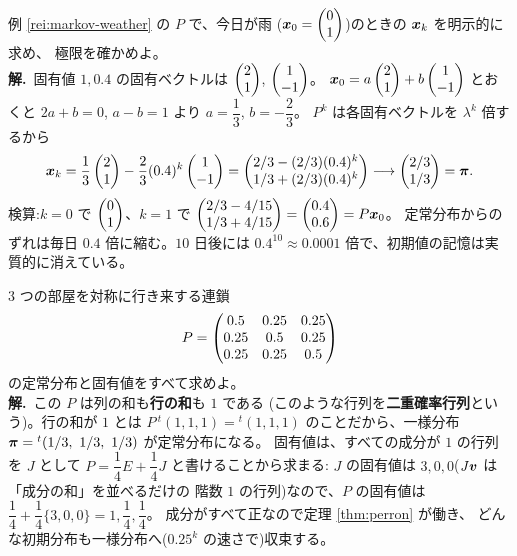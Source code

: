 \begin{rei}[例題・標準(分布の明示式と収束の速さ)]\label{rei:markov-std2}
例 \ref{rei:markov-weather} の $P$ で、今日が雨
($\bm{x}_0 = \begin{pmatrix}0 \\ 1\end{pmatrix}$)のときの $\bm{x}_k$ を明示的に求め、
極限を確かめよ。\\
\textbf{解.}\ 固有値 $1, 0.4$ の固有ベクトルは
$\begin{pmatrix}2 \\ 1\end{pmatrix}$, $\begin{pmatrix}1 \\ -1\end{pmatrix}$。
$\bm{x}_0 = a\begin{pmatrix}2 \\ 1\end{pmatrix} + b\begin{pmatrix}1 \\ -1\end{pmatrix}$ とおくと
$2a + b = 0$, $a - b = 1$ より $a = \dfrac{1}{3}$, $b = -\dfrac{2}{3}$。
$P^k$ は各固有ベクトルを $\lambda^k$ 倍するから
\[
\bm{x}_k = \frac{1}{3}\begin{pmatrix}2 \\ 1\end{pmatrix} - \frac{2}{3}(0.4)^k \begin{pmatrix}1 \\ -1\end{pmatrix}
= \begin{pmatrix}2/3 - (2/3)(0.4)^k \\ 1/3 + (2/3)(0.4)^k\end{pmatrix}
\longrightarrow \begin{pmatrix}2/3 \\ 1/3\end{pmatrix} = \bm{\pi}.
\]
検算:$k = 0$ で $\begin{pmatrix}0 \\ 1\end{pmatrix}$、$k = 1$ で
$\begin{pmatrix}2/3 - 4/15 \\ 1/3 + 4/15\end{pmatrix} = \begin{pmatrix}0.4 \\ 0.6\end{pmatrix} = P\bm{x}_0$。
定常分布からのずれは毎日 $0.4$ 倍に縮む。$10$ 日後には
$0.4^{10} \approx 0.0001$ 倍で、初期値の記憶は実質的に消えている。
\end{rei}

\begin{rei}[例題・標準(対称な連鎖と一様分布)]\label{rei:markov-std3}
$3$ つの部屋を対称に行き来する連鎖
\[
P = \begin{pmatrix}0.5 & 0.25 & 0.25 \\ 0.25 & 0.5 & 0.25 \\ 0.25 & 0.25 & 0.5\end{pmatrix}
\]
の定常分布と固有値をすべて求めよ。\\
\textbf{解.}\ この $P$ は列の和も\textbf{行の和}も $1$ である
(このような行列を\textbf{二重確率行列}という)。行の和が $1$ とは
$P\,{}^t(1,1,1) = {}^t(1,1,1)$ のことだから、一様分布
$\bm{\pi} = {}^t(1/3,\ 1/3,\ 1/3)$ が定常分布になる。
固有値は、すべての成分が $1$ の行列を $J$ として
$P = \dfrac{1}{4}E + \dfrac{1}{4}J$ と書けることから求まる:
$J$ の固有値は $3, 0, 0$($J\bm{v}$ は「成分の和」を並べるだけの
階数 $1$ の行列)なので、$P$ の固有値は
$\dfrac{1}{4} + \dfrac{1}{4}\{3, 0, 0\} = 1, \dfrac{1}{4}, \dfrac{1}{4}$。
成分がすべて正なので定理 \ref{thm:perron} が働き、
どんな初期分布も一様分布へ($0.25^k$ の速さで)収束する。
\end{rei}


